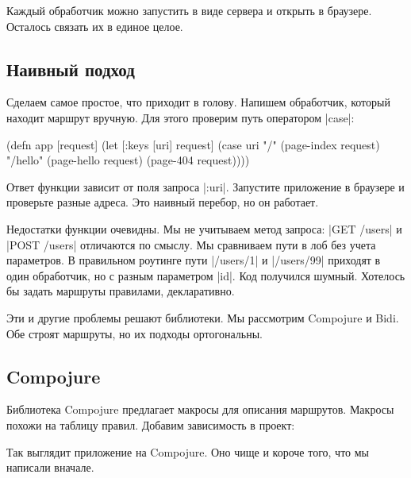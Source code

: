 Каждый обработчик можно запустить в виде сервера и открыть в браузере. Осталось
связать их в единое целое.

\subsection{Наивный подход}

Сделаем самое простое, что приходит в голову. Напишем обработчик, который
находит маршрут вручную. Для этого проверим путь оператором \spverb|case|:

\begin{english}
  \begin{clojure}
(defn app [request]
  (let [{:keys [uri]} request]
    (case uri
      "/"      (page-index request)
      "/hello" (page-hello request)
      (page-404 request))))
  \end{clojure}
\end{english}

Ответ функции зависит от поля запроса \spverb|:uri|. Запустите приложение в
браузере и проверьте разные адреса. Это наивный перебор, но он работает.

Недостатки функции очевидны. Мы не учитываем метод запроса: \spverb|GET /users|
и \spverb|POST /users| отличаются по смыслу. Мы сравниваем пути в лоб без учета
параметров. В правильном роутинге пути \spverb|/users/1| и \spverb|/users/99|
приходят в один обработчик, но с разным параметром \spverb|id|. Код получился
шумный. Хотелось бы задать маршруты правилами, декларативно.

Эти и другие проблемы решают библиотеки. Мы рассмотрим Compojure и Bidi. Обе
строят маршруты, но их подходы ортогональны.

\subsection{Compojure}

\label{compojure}

Библиотека Compojure
предлагает макросы для описания маршрутов. Макросы похожи на таблицу правил.
Добавим зависимость в проект:

\begin{english}
  \begin{clojure}
[compojure "1.6.1"]
  \end{clojure}
\end{english}

Так выглядит приложение на Compojure. Оно чище и короче того, что мы написали
вначале.

